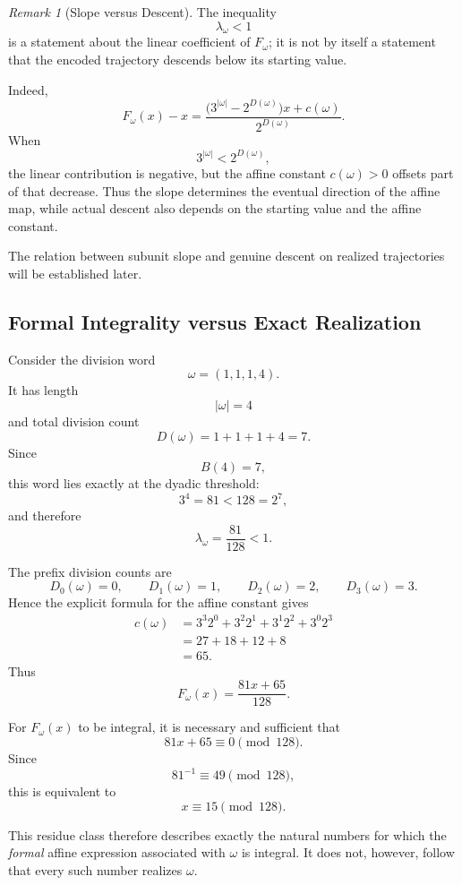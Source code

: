 \documentclass[12pt, oneside]{article}
\numberwithin{equation}{section}
\theoremstyle{definition}
\theoremstyle{plain}
\theoremstyle{remark}
\newtheorem*{remark}{Remark}
\begin{document}
\begin{remark}[Slope versus Descent]
The inequality
\[
\lambda_\omega<1
\]
is a statement about the linear coefficient of \(F_\omega\); it is not by
itself a statement that the encoded trajectory descends below its starting
value.

Indeed,
\[
F_\omega(x)-x
=
\frac{
\bigl(3^{|\omega|}-2^{D(\omega)}\bigr)x+c(\omega)}
{2^{D(\omega)}}.
\]
When
\[
3^{|\omega|}<2^{D(\omega)},
\]
the linear contribution is negative, but the affine constant
\(c(\omega)>0\) offsets part of that decrease. Thus the slope determines
the eventual direction of the affine map, while actual descent also
depends on the starting value and the affine constant.

The relation between subunit slope and genuine descent on realized
trajectories will be established later.
\end{remark}

\subsection{Formal Integrality versus Exact Realization}

Consider the division word
\[
\omega=(1,1,1,4).
\]
It has length
\[
|\omega|=4
\]
and total division count
\[
D(\omega)=1+1+1+4=7.
\]
Since
\[
B(4)=7,
\]
this word lies exactly at the dyadic threshold:
\[
3^4=81<128=2^7,
\]
and therefore
\[
\lambda_\omega=\frac{81}{128}<1.
\]

The prefix division counts are
\[
D_0(\omega)=0,\qquad
D_1(\omega)=1,\qquad
D_2(\omega)=2,\qquad
D_3(\omega)=3.
\]
Hence the explicit formula for the affine constant gives
\[
\begin{aligned}
c(\omega)
&=
3^3 2^0
+
3^2 2^1
+
3^1 2^2
+
3^0 2^3\\
&=
27+18+12+8\\
&=
65.
\end{aligned}
\]
Thus
\[
F_\omega(x)
=
\frac{81x+65}{128}.
\]

For \(F_\omega(x)\) to be integral, it is necessary and sufficient that
\[
81x+65\equiv0\pmod{128}.
\]
Since
\[
81^{-1}\equiv49\pmod{128},
\]
this is equivalent to
\[
x\equiv15\pmod{128}.
\]

This residue class therefore describes exactly the natural numbers for which
the \emph{formal} affine expression associated with \(\omega\) is integral.
It does not, however, follow that every such number realizes \(\omega\).
\end{document}
